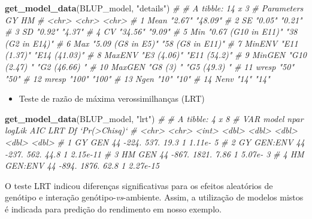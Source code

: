 \documentclass[
]{book}
\newenvironment{Shaded}{\begin{snugshade}}{\end{snugshade}}
\newcommand{\CommentTok}[1]{\textcolor[rgb]{0.56,0.35,0.01}{\textit{#1}}}
\newcommand{\KeywordTok}[1]{\textcolor[rgb]{0.13,0.29,0.53}{\textbf{#1}}}
\newcommand{\NormalTok}[1]{#1}
\newcommand{\StringTok}[1]{\textcolor[rgb]{0.31,0.60,0.02}{#1}}
\providecommand{\tightlist}{%
  \setlength{\itemsep}{0pt}\setlength{\parskip}{0pt}}
\begin{document}
\begin{Shaded}
\begin{Highlighting}[]
\KeywordTok{get_model_data}\NormalTok{(BLUP_model, }\StringTok{"details"}\NormalTok{)}
\CommentTok{# # A tibble: 14 x 3}
\CommentTok{#    Parameters GY                  HM              }
\CommentTok{#    <chr>      <chr>               <chr>           }
\CommentTok{#  1 Mean       "2.67"              "48.09"         }
\CommentTok{#  2 SE         "0.05"              "0.21"          }
\CommentTok{#  3 SD         "0.92"              "4.37"          }
\CommentTok{#  4 CV         "34.56"             "9.09"          }
\CommentTok{#  5 Min        "0.67 (G10 in E11)" "38 (G2 in E14)"}
\CommentTok{#  6 Max        "5.09 (G8 in E5)"   "58 (G8 in E11)"}
\CommentTok{#  7 MinENV     "E11 (1.37)"        "E14 (41.03)"   }
\CommentTok{#  8 MaxENV     "E3 (4.06)"         "E11 (54.2)"    }
\CommentTok{#  9 MinGEN     "G10 (2.47) "       "G2 (46.66) "   }
\CommentTok{# 10 MaxGEN     "G8 (3) "           "G5 (49.3) "    }
\CommentTok{# 11 wresp      "50"                "50"            }
\CommentTok{# 12 mresp      "100"               "100"           }
\CommentTok{# 13 Ngen       "10"                "10"            }
\CommentTok{# 14 Nenv       "14"                "14"}
\end{Highlighting}
\end{Shaded}

\begin{itemize}
\tightlist
\item
  Teste de razão de máxima verossimilhanças (LRT)
\end{itemize}

\begin{Shaded}
\begin{Highlighting}[]
\KeywordTok{get_model_data}\NormalTok{(BLUP_model, }\StringTok{"lrt"}\NormalTok{)}
\CommentTok{# # A tibble: 4 x 8}
\CommentTok{#   VAR   model    npar logLik   AIC   LRT    Df `Pr(>Chisq)`}
\CommentTok{#   <chr> <chr>   <int>  <dbl> <dbl> <dbl> <dbl>        <dbl>}
\CommentTok{# 1 GY    GEN        44  -224.  537. 19.3      1     1.11e- 5}
\CommentTok{# 2 GY    GEN:ENV    44  -237.  562. 44.8      1     2.15e-11}
\CommentTok{# 3 HM    GEN        44  -867. 1821.  7.86     1     5.07e- 3}
\CommentTok{# 4 HM    GEN:ENV    44  -894. 1876. 62.8      1     2.27e-15}
\end{Highlighting}
\end{Shaded}

O teste LRT  indicou diferenças significativas para os efeitos aleatórios de genótipo e interação genótipo-\emph{vs}-ambiente. Assim, a utilização de modelos mistos é indicada para predição do rendimento em nosso exemplo.
\end{document}
